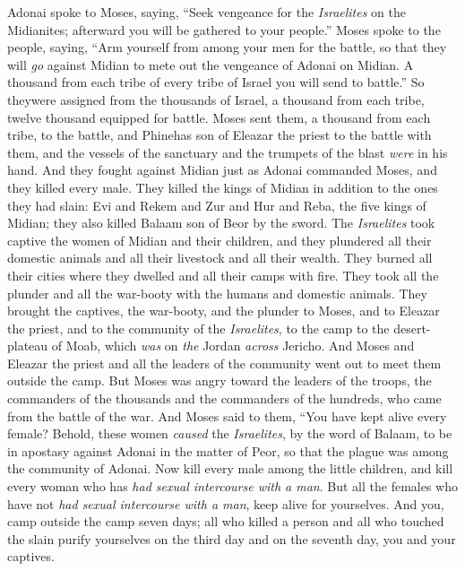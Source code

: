\begin{biblechapter} %
 Adonai spoke to Moses, saying,
\verse “Seek vengeance for the \textit{Israelites} on the Midianites; afterward you will be gathered to your people.”
\verse Moses spoke to the people, saying, “Arm yourself from among your men for the battle, so that they will \textit{go} against Midian to mete out the vengeance of Adonai on Midian.
\verse A thousand from each tribe of every tribe of Israel you will send to battle.”
\verse So theywere assigned from the thousands of Israel, a thousand from each tribe, twelve thousand equipped for battle.
\verse Moses sent them, a thousand from each tribe, to the battle, and Phinehas son of Eleazar the priest to the battle with them, and the vessels of the sanctuary and the trumpets of the blast \textit{were} in his hand.
\verse And they fought against Midian just as Adonai commanded Moses, and they killed every male.
\verse They killed the kings of Midian in addition to the ones they had slain: Evi and Rekem and Zur and Hur and Reba, the five kings of Midian; they also killed Balaam son of Beor by the sword.
\verse The \textit{Israelites} took captive the women of Midian and their children, and they plundered all their domestic animals and all their livestock and all their wealth.
\verse They burned all their cities where they dwelled and all their camps with fire.
\verse They took all the plunder and all the war-booty with the humans and domestic animals.
\verse They brought the captives, the war-booty, and the plunder to Moses, and to Eleazar the priest, and to the community of the \textit{Israelites}, to the camp to the desert-plateau of Moab, which \textit{was} on \textit{the} Jordan \textit{across} Jericho.
\verse And Moses and Eleazar the priest and all the leaders of the community went out to meet them outside the camp.
\verse But Moses was angry toward the leaders of the troops, the commanders of the thousands and the commanders of the hundreds, who came from the battle of the war.
\verse And Moses said to them, “You have kept alive every female?
\verse Behold, these women \textit{caused} the \textit{Israelites}, by the word of Balaam, to be in apostasy against Adonai in the matter of Peor, so that the plague was among the community of Adonai.
\verse Now kill every male among the little children, and kill every woman who has \textit{had sexual intercourse with a man}.
\verse But all the females who have not \textit{had sexual intercourse with a man}, keep alive for yourselves.
\verse And you, camp outside the camp seven days; all who killed a person and all who touched the slain purify yourselves on the third day and on the seventh day, you and your captives.

\end{biblechapter}
